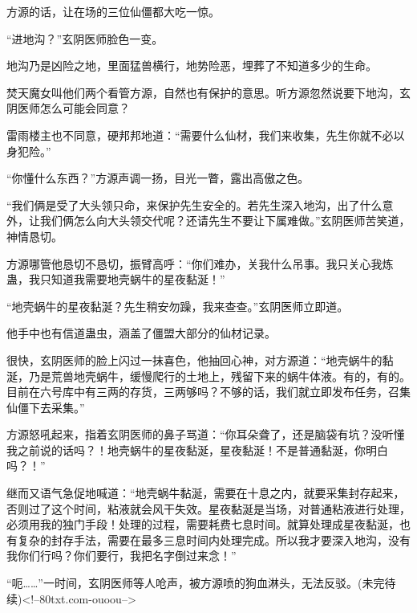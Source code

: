 \begin{this_body}
方源的话，让在场的三位仙僵都大吃一惊。

“进地沟？”玄阴医师脸色一变。

地沟乃是凶险之地，里面猛兽横行，地势险恶，埋葬了不知道多少的生命。

焚天魔女叫他们两个看管方源，自然也有保护的意思。听方源忽然说要下地沟，玄阴医师怎么可能会同意？

雷雨楼主也不同意，硬邦邦地道：“需要什么仙材，我们来收集，先生你就不必以身犯险。”

“你懂什么东西？”方源声调一扬，目光一瞥，露出高傲之色。

“我们俩是受了大头领只命，来保护先生安全的。若先生深入地沟，出了什么意外，让我们俩怎么向大头领交代呢？还请先生不要让下属难做。”玄阴医师苦笑道，神情恳切。

方源哪管他恳切不恳切，振臂高呼：“你们难办，关我什么吊事。我只关心我炼蛊，我只知道我需要地壳蜗牛的星夜黏涎！”

“地壳蜗牛的星夜黏涎？先生稍安勿躁，我来查查。”玄阴医师立即道。

他手中也有信道蛊虫，涵盖了僵盟大部分的仙材记录。

很快，玄阴医师的脸上闪过一抹喜色，他抽回心神，对方源道：“地壳蜗牛的黏涎，乃是荒兽地壳蜗牛，缓慢爬行的土地上，残留下来的蜗牛体液。有的，有的。目前在六号库中有三两的存货，三两够吗？不够的话，我们就立即发布任务，召集仙僵下去采集。”

方源怒吼起来，指着玄阴医师的鼻子骂道：“你耳朵聋了，还是脑袋有坑？没听懂我之前说的话吗？！地壳蜗牛的星夜黏涎，星夜黏涎！不是普通黏涎，你明白吗？！”

继而又语气急促地喊道：“地壳蜗牛黏涎，需要在十息之内，就要采集封存起来，否则过了这个时间，粘液就会风干失效。星夜黏涎是当场，对普通粘液进行处理，必须用我的独门手段！处理的过程，需要耗费七息时间。就算处理成星夜黏涎，也有复杂的封存手法，需要在最多三息时间内处理完成。所以我才要深入地沟，没有我你们行吗？你们要行，我把名字倒过来念！”

“呃……”一时间，玄阴医师等人呛声，被方源喷的狗血淋头，无法反驳。(未完待续)<!--80txt.com-ouoou-->

\end{this_body}

